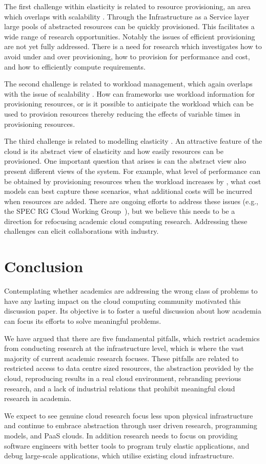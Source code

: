 \documentclass[letterpaper,twocolumn,10pt]{article}
\begin{document}
The first challenge within elasticity is related to resource provisioning, an area which overlaps with scalability \cite{elasticity-2, elasticity-5}. Through the Infrastructure as a Service layer large pools of abstracted resources can be quickly provisioned. This facilitates a wide range of research opportunities. Notably the issues of efficient provisioning are not yet fully addressed. There is a need for research which investigates how to avoid under and over provisioning, how to provision for performance and cost, and how to efficiently compute requirements. 

The second challenge is related to workload management, which again overlaps with the issue of scalability \cite{elasticity-6}. How can frameworks use workload information for provisioning resources, or is it possible to anticipate the workload which can be used to provision resources thereby reducing the effects of variable times in provisioning resources. 

The third challenge is related to modelling elasticity \cite{elasticity-3, elasticity-4}. An attractive feature of the cloud is its abstract view of elasticity and how easily resources can be provisioned. One important question that arises is can the abstract view also present different views of the system. For example, what level of performance can be obtained by provisioning  resources when the workload increases by , what cost models can best capture these scenarios, what additional costs will be incurred when  resources are added.  There are ongoing efforts to address these issues (e.g., the SPEC RG Cloud Working Group~\cite{SPEC}), but we believe this needs to be a direction for refocusing academic cloud computing research. Addressing these challenges can elicit collaborations with industry.

\section{Conclusion}
Contemplating whether academics are addressing the wrong class of problems to have any lasting impact on the cloud computing community motivated this discussion paper. Its objective is to foster a useful discussion about how academia can focus its efforts to solve meaningful problems. 

We have argued that there are five fundamental pitfalls, which restrict academics from conducting research at the infrastructure level, which is where the vast majority of current academic research focuses. These pitfalls are related to restricted access to data centre sized resources, the abstraction provided by the cloud, reproducing results in a real cloud environment, rebranding previous research, and a lack of industrial relations that prohibit meaningful cloud research in academia. 

We expect to see genuine cloud research focus less upon physical infrastructure and continue to embrace abstraction through user driven research, programming models, and PaaS clouds. In addition research needs to focus on providing software engineers with better tools to program truly elastic applications, and debug large-scale applications, which utilise existing cloud infrastructure.

{\footnotesize 
}
\end{document}
